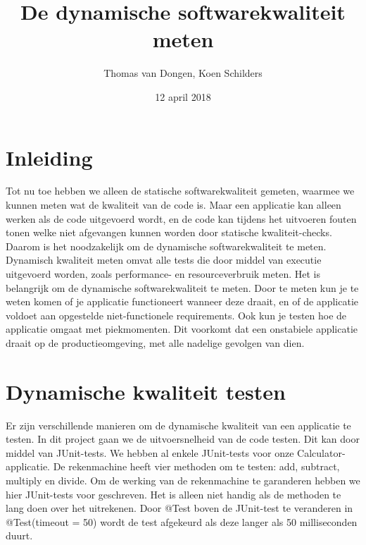 \documentclass[12pt]{article}
\title{De dynamische softwarekwaliteit meten}
\author{Thomas van Dongen, Koen Schilders}
\date{12 april 2018}
\begin{document}
\begin{titlepage}
\maketitle
\end{titlepage}

\section{Inleiding}



Tot nu toe hebben we alleen de statische softwarekwaliteit gemeten, waarmee we kunnen meten wat de kwaliteit van de code is. Maar een applicatie kan alleen werken als de code uitgevoerd wordt, en de code kan tijdens het uitvoeren fouten tonen welke niet afgevangen kunnen worden door statische kwaliteit-checks. Daarom is het noodzakelijk om de dynamische softwarekwaliteit te meten. Dynamisch kwaliteit meten omvat alle tests die door middel van executie uitgevoerd worden, zoals performance- en resourceverbruik meten.
Het is belangrijk om de dynamische softwarekwaliteit te meten. Door te meten kun je te weten komen of je applicatie functioneert wanneer deze draait, en of de applicatie voldoet aan opgestelde niet-functionele requirements. Ook kun je testen hoe de applicatie omgaat met piekmomenten. Dit voorkomt dat een onstabiele applicatie draait op de productieomgeving, met alle nadelige gevolgen van dien.


\section{Dynamische kwaliteit testen}
Er zijn verschillende manieren om de dynamische kwaliteit van een applicatie te testen. In dit project gaan we de uitvoersnelheid van de code testen. Dit kan door middel van JUnit-tests. We hebben al enkele JUnit-tests voor onze Calculator-applicatie. De rekenmachine heeft vier methoden om te testen: add, subtract, multiply en divide. Om de werking van de rekenmachine te garanderen hebben we hier JUnit-tests voor geschreven. Het is alleen niet handig als de methoden te lang doen over het uitrekenen. Door @Test boven de JUnit-test te veranderen in @Test(timeout = 50) wordt de test afgekeurd als deze langer als 50 milliseconden duurt.
\end{document}
